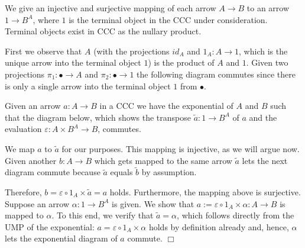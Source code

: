 
We give an injective and surjective mapping of each arrow $A → B$ to an arrow $1 → B^A$, where $1$ is the terminal object in the CCC under consideration. Terminal objects exist in CCC as the nullary product.

First we observe that $A$ (with the projections $id_A$ and $1_A : A → 1$, which is the unique arrow into the terminal object $1$) is the product of $A$ and $1$. Given two projections $π_1 : • → A$ and $π_2 : • → 1$ the following diagram commutes since there is only a single arrow into the terminal object $1$ from $•$.


Given an arrow $a : A → B$ in a CCC we have the exponential of $A$ and $B$ such that the diagram below, which shows the transpose $\tilde{a} : 1 → B^A$ of $a$ and the evaluation $ε : A × B^A → B$, commutes.


We map $a$ to $\tilde{a}$ for our purposes. This mapping is injective, as we will argue now. Given another $b : A → B$ which gets mapped to the same arrow $\tilde{a}$ lets the next diagram commute because $\tilde{a}$ equals $\tilde{b}$ by assumption.


Therefore, $b = ε ∘ 1_A × \tilde{a} = a$ holds. Furthermore, the mapping above is surjective. Suppose an arrow $α : 1 → B^A$ is given. We show that $a := ε ∘ 1_A × α : A → B$ is mapped to $α$. To this end, we verify that $\tilde{a} = α$, which follows directly from the UMP of the exponential: $a = ε ∘ 1_A × α$ holds by definition already and, hence, $α$ lets the exponential diagram of $a$ commute. \hfill $\Box$
